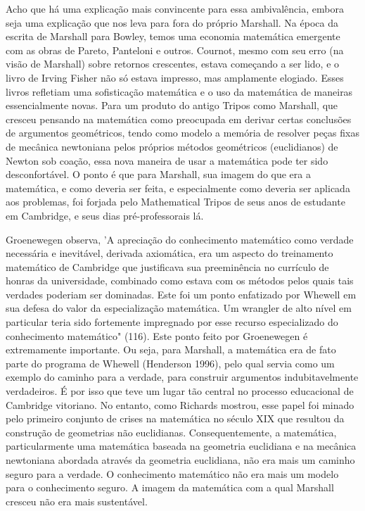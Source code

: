 \documentclass[a4paper,12pt]{article}[abntex2]
\begin{document}
Acho que há uma explicação mais convincente para essa ambivalência, embora seja uma explicação que nos leva para fora do próprio Marshall. Na época da escrita de Marshall para Bowley, temos uma economia matemática emergente com as obras de Pareto, Panteloni e outros. Cournot, mesmo com seu erro (na visão de Marshall) sobre retornos crescentes, estava começando a ser lido, e o livro de Irving Fisher não só estava impresso, mas amplamente elogiado. Esses livros refletiam uma sofisticação matemática e o uso da matemática de maneiras essencialmente novas. Para um produto do antigo Tripos como Marshall, que cresceu pensando na matemática como preocupada em derivar certas conclusões de argumentos geométricos, tendo como modelo a memória de resolver peças fixas de mecânica newtoniana pelos próprios métodos geométricos (euclidianos) de Newton sob coação, essa nova maneira de usar a matemática pode ter sido desconfortável. O ponto é que para Marshall, sua imagem do que era a matemática, e como deveria ser feita, e especialmente como deveria ser aplicada aos problemas, foi forjada pelo Mathematical Tripos de seus anos de estudante em Cambridge, e seus dias pré-professorais lá.

Groenewegen observa, 'A apreciação do conhecimento matemático como verdade necessária e inevitável, derivada axiomática, era um aspecto do treinamento matemático de Cambridge que justificava sua preeminência no currículo de honras da universidade, combinado como estava com os métodos pelos quais tais verdades poderiam ser dominadas. Este foi um ponto enfatizado por Whewell em sua defesa do valor da especialização matemática. Um wrangler de alto nível em particular teria sido fortemente impregnado por esse recurso especializado do conhecimento matemático" (116). Este ponto feito por Groenewegen é extremamente importante. Ou seja, para Marshall, a matemática era de fato parte do programa de Whewell (Henderson 1996), pelo qual servia como um exemplo do caminho para a verdade, para construir argumentos indubitavelmente verdadeiros. É por isso que teve um lugar tão central no processo educacional de Cambridge vitoriano. No entanto, como Richards mostrou, esse papel foi minado pelo primeiro conjunto de crises na matemática no século XIX que resultou da construção de geometrias não euclidianas. Consequentemente, a matemática, particularmente uma matemática baseada na geometria euclidiana e na mecânica newtoniana abordada através da geometria euclidiana, não era mais um caminho seguro para a verdade. O conhecimento matemático não era mais um modelo para o conhecimento seguro. A imagem da matemática com a qual Marshall cresceu não era mais sustentável.
\end{document}
